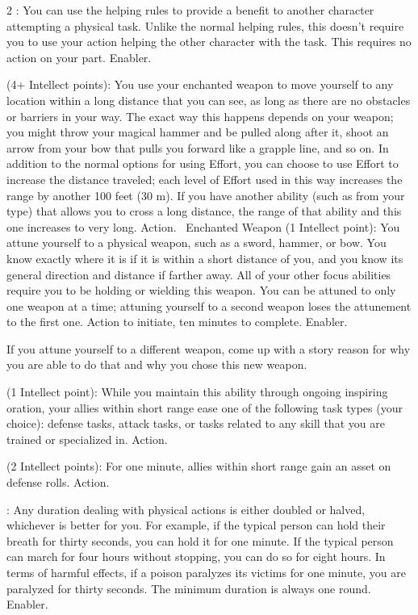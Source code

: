 \begin{multicols}{2}
: You can use the helping rules to provide a benefit to another character attempting a physical task. Unlike the normal helping rules, this doesn’t require you to use your action helping the other character with the task. This requires no action on your part. Enabler. 
 
 (4+ Intellect points): You use your enchanted weapon to move yourself to any location within a long distance that you can see, as long as there are no obstacles or barriers in your way. The exact way this happens depends on your weapon; you might throw your magical hammer and be pulled along after it, shoot an arrow from your bow that pulls you forward like a grapple line, and so on. In addition to the normal options for using Effort, you can choose to use Effort to increase the distance traveled; each level of Effort used in this way increases the range by another 100 feet (30 m). If you have another ability (such as from your type) that allows you to cross a long distance, the range of that ability and this one increases to very long. Action. 
Enchanted Weapon (1 Intellect point): You attune yourself to a physical weapon, such as a sword, hammer, or bow. You know exactly where it is if it is within a short distance of you, and you know its general direction and distance if farther away. All of your other focus abilities require you to be holding or wielding this weapon. You can be attuned to only one weapon at a time; attuning yourself to a second weapon loses the attunement to the first one. Action to initiate, ten minutes to complete. Enabler. 

If you attune yourself to a different weapon, come up with a story reason for why you are able to do that and why you chose this new weapon.

 (1 Intellect point): While you maintain this ability through ongoing inspiring oration, your allies within short range ease one of the following task types (your choice): defense tasks, attack tasks, or tasks related to any skill that you are trained or specialized in. Action. 
 
 (2 Intellect points): For one minute, allies within short range gain an asset on defense rolls. Action. 
 
: Any duration dealing with physical actions is either doubled or halved, whichever is better for you. For example, if the typical person can hold their breath for thirty seconds, you can
hold it for one minute. If the typical person can march for four hours without stopping, you can do so for eight hours. In terms of harmful effects, if a poison paralyzes its victims for one minute, you are paralyzed for thirty seconds. The minimum duration is always one round. Enabler. 
 

\end{multicols}
